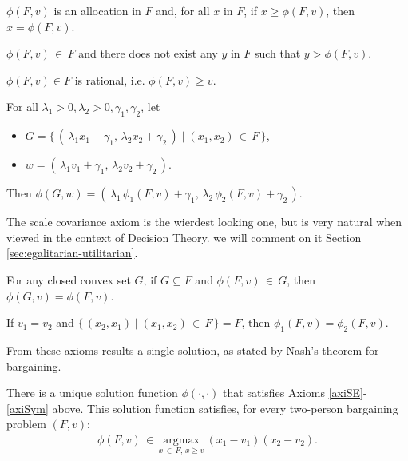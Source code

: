 \begin{axiom} $\phi(F, v)$ is an allocation in $F$ and, for all $x$ in $F$, if $x \geq \phi(F, v)$, then $x = \phi(F, v)$.
\label{axiSE}
\end{axiom}
\begin{axiom} $\phi(F, v) \, \in \, F$ and there does not exist any $y$ in $F$ such that $y > \phi(F, v)$.
\end{axiom}
\begin{axiom} $\phi(F, v) \in F$ is rational, i.e. $\phi(F, v) \geq v$.
\end{axiom}
\begin{axiom} For all $\lambda_1 > 0, \lambda_2 > 0, \gamma_1, \gamma_2$, let
	\begin{itemize}
		\item $G = \{ \, ( \, \lambda_1 x_1 + \gamma_1, \, \lambda_2 x_2 + \gamma_2 \, ) \; | \; (x_1, x_2) \, \in \, F \, \}$,
		\item $w = ( \, \lambda_1 v_1 + \gamma_1, \, \lambda_2 v_2 + \gamma_2 \, )$.
	\end{itemize}
	Then $\phi(G, w) = ( \, \lambda_1 \,  \phi_1(F, v) + \gamma_1, \,  \lambda_2 \,  \phi_2(F, v) + \gamma_2 \, )$.
	\label{scalecov}
\end{axiom}
The scale covariance axiom is the wierdest looking one, but is very natural when viewed in the context of Decision Theory. we will comment on it Section \ref{sec:egalitarian-utilitarian}.
\begin{axiom} For any closed convex set $G$, if $G \subseteq F$ and $\phi(F, v) \, \in \, G$, then $\phi(G, v) = \phi(F, v)$.
\end{axiom}
\begin{axiom}[Symmetry.] If $v_1 = v_2$ and $\{ \, (x_2, x_1) \; | \; (x_1, x_2) \, \in \, F \, \} = F$, then $\phi_1(F, v) = \phi_2(F, v)$.
\label{axiSym}
\end{axiom}


From these axioms results a single solution, as stated by Nash's theorem for bargaining.

\begin{theorem}
There is a unique solution function $\phi(\cdot, \cdot)$ that satisfies Axioms \ref{axiSE}-\ref{axiSym} above. This solution function satisfies, for every two-person bargaining problem $(F, v)$:
\begin{align} \label{thm1}
	\phi(F, v) \, \in \, \underset{x \, \in \, F, \, x \geq v}{\mathrm{argmax}} \ (x_1 - v_1)(x_2 - v_2).
\end{align}
\end{theorem}

